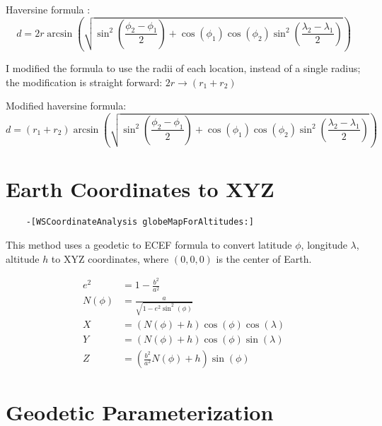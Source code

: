 \documentclass{article}
\begin{document}
Haversine formula \cite[Formulation]{wikipedia_Haversine_formula}:
\begin{equation}
    d = 2r \arcsin \left(\sqrt{
        \sin^2 \left(\frac{\phi_2 - \phi_1}{2}\right) + 
        \cos \left(\phi_1\right) \cos \left(\phi_2\right)
        \sin^2 \left(\frac{\lambda_2 - \lambda_1}{2}\right)
    }\right)
\end{equation}


I modified the formula to use the radii of each location, instead of
a single radius; the modification is straight forward: 
$2r \rightarrow \left(r_1 + r_2\right)$

Modified haversine formula:
\begin{equation}
    d = \left(r_1 + r_2\right) \arcsin \left(\sqrt{
        \sin^2 \left(\frac{\phi_2 - \phi_1}{2}\right) + 
        \cos \left(\phi_1\right) \cos \left(\phi_2\right)
        \sin^2 \left(\frac{\lambda_2 - \lambda_1}{2}\right)
    }\right)
\end{equation}

\pagebreak
\section{Earth Coordinates to XYZ}

\begin{verbatim}
    -[WSCoordinateAnalysis globeMapForAltitudes:]  
\end{verbatim}

This method uses a geodetic to ECEF formula 
\cite[From geodetic to ECEF coordinates]{wikipedia_Geographic_coordinate_conversion} 
to convert latitude $\phi$, longitude $\lambda$, altitude $h$ 
to XYZ coordinates, 
where $\left(0, 0, 0\right)$ is the center of Earth.

\begin{align}
    e^2 &= 1 - \frac{b^2}{a^2} \\
    N(\phi) &= \frac{a}{\sqrt{1 - e^2 \sin^2 \left(\phi\right) }} \\
    X &= \left(N\left(\phi\right) + h\right)
        \cos\left(\phi\right) \cos\left(\lambda\right) \\
    Y &= \left(N\left(\phi\right) + h\right)
        \cos\left(\phi\right) \sin\left(\lambda\right) \\
    Z &= \left(\frac{b^2}{a^2} N\left(\phi\right) + h\right)
        \sin\left(\phi\right)
\end{align}

\pagebreak
\section{Geodetic Parameterization}
\end{document}
